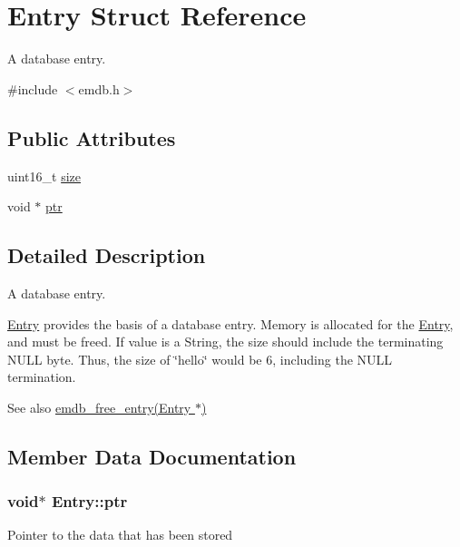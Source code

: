 \hypertarget{struct_entry}{}\section{Entry Struct Reference}
\label{struct_entry}


A database entry.  




{\ttfamily \#include $<$emdb.\+h$>$}

\subsection*{Public Attributes}
\begin{DoxyCompactItemize}
\item 
uint16\+\_\+t \hyperlink{struct_entry_a982728099c1c8bf6e6eb24736f9cc8f3}{size}
\item 
void $\ast$ \hyperlink{struct_entry_aa88c7d1c3b4c4e69ea46dc9559224dc1}{ptr}
\end{DoxyCompactItemize}


\subsection{Detailed Description}
A database entry. 

\hyperlink{struct_entry}{Entry} provides the basis of a database entry. Memory is allocated for the \hyperlink{struct_entry}{Entry}, and must be freed. If value is a {\ttfamily String}, the size should include the terminating N\+U\+L\+L byte. Thus, the size of \char`\"{}hello\char`\"{} would be 6, including the N\+U\+L\+L termination. \begin{DoxySeeAlso}{See also}
\hyperlink{emdb_8h_a8fd691da056962b197364ac167e0d421}{emdb\+\_\+free\+\_\+entry(\+Entry $\ast$)} 
\end{DoxySeeAlso}


\subsection{Member Data Documentation}
\hypertarget{struct_entry_aa88c7d1c3b4c4e69ea46dc9559224dc1}{}
\subsubsection[{ptr}]{\setlength{\rightskip}{0pt plus 5cm}void$\ast$ Entry\+::ptr}\label{struct_entry_aa88c7d1c3b4c4e69ea46dc9559224dc1}
Pointer to the data that has been stored \hypertarget{struct_entry_a982728099c1c8bf6e6eb24736f9cc8f3}{}
